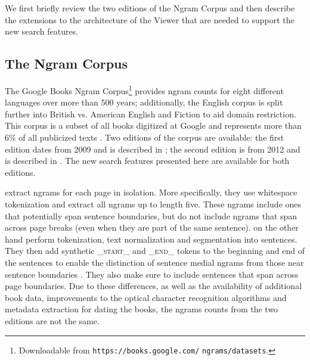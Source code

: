 \documentclass[11pt,a4paper]{article}
\begin{document}
We first briefly review the two editions of the Ngram Corpus \cite{culturomics,lin2012syntactic} and then describe the extensions to the architecture of the Viewer that are needed to support the new search features.


\subsection{The Ngram Corpus}
	The Google Books Ngram Corpus\footnote{Downloadable from \texttt{https://books.google.com/} \texttt{ngrams/datasets}.} provides ngram counts for eight different languages over more than 500 years; additionally, the English corpus is split further into British vs. American English and Fiction to aid domain restriction. This corpus is a subset of all books digitized at Google and represents more than 6\% of all publicized texts \cite{lin2012syntactic}. Two editions of the corpus are available: the first edition dates from 2009 and is described in ; the second edition is from 2012 and is described in . The new search features presented here are available for both editions.

 extract ngrams for each page in isolation. More specifically, they use whitespace tokenization and extract all ngrams up to length five. These ngrams include ones that potentially span sentence boundaries, but do not include ngrams that span across page breaks (even when they are part of the same sentence).
 on the other hand perform tokenization, text normalization and segmentation into sentences. They then add synthetic \textsf{\textsc{\_start\_}} and \textsf{\textsc{\_end\_}} tokens to the beginning and end of the sentences to enable the distinction of sentence medial ngrams from those near sentence boundaries \cite{lin2012syntactic}. They also make sure to include sentences that span across page boundaries. Due to these differences, as well as the availability of additional book data, improvements to the optical character recognition algorithms and metadata extraction for dating the books, the ngrams counts from the two editions are not the same.
\end{document}
